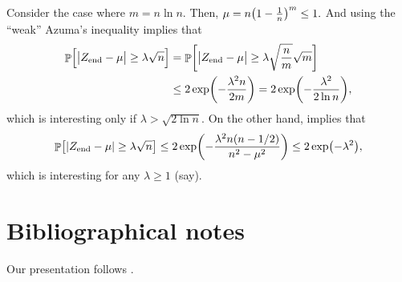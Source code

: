 Consider the case where $m = n \ln n$. Then,
\begin{math}
    \mu = n \pth[]{1-\frac{1}{n}}^m \leq 1.
\end{math}
And using the ``weak'' Azuma's inequality implies that
\begin{align*}
  \Prob{ \Bigl. \cardin{\bigl. Z_{\textrm{end}} - \mu}
  \geq  \lambda \sqrt{n} }%
  &=%
  \Prob{ \biggl. \cardin{\bigl. Z_{\textrm{end}} - \mu} \geq \lambda
  \sqrt{\frac{n}{m}} \sqrt{m} }%
  \\&%
  \leq%
  2 \exp \pth{ - \frac{\lambda^2n}{2m}}%
  =%
  2 \exp \pth{ - \frac{\lambda^2}{2\ln n}},%
\end{align*}
which is interesting only if $\lambda > \sqrt{ 2 \ln n}$. On the other
hand,  implies that
\begin{align*}
  \Prob{ \bigl. \cardin{ Z_{\textrm{end}} - \mu} \geq \lambda
  \sqrt{n} }%
  \leq%
  2 \exp \pth{ - \frac{\lambda^2 n (n-1/2)}{n^2 -
  \mu^2}} %
  \leq%
  2 \exp \pth{ - \lambda^2 },
\end{align*}
which is interesting for any $\lambda \geq 1$ (say).

\section{Bibliographical notes}

Our presentation follows \cite{mr-ra-95}.

\ChapterEnd{}

